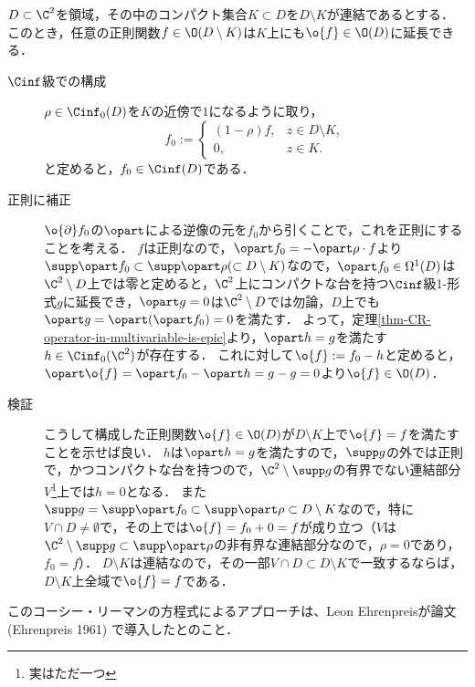 \documentclass[uplatex, dvipdfmx]{jsreport}
\begin{document}
\begin{theorem}[Hartogs (1906)]\label{thm-Hartogs}
    $D\subset\C^2$を領域，その中のコンパクト集合$K\subset D$を$D\setminus K$が連結であるとする．
    このとき，任意の正則関数$f\in\O(D\setminus K)$は$K$上にも$\o{f}\in\O(D)$に延長できる．
\end{theorem}
\begin{Proof}\mbox{}
    \begin{description}
        \item[$\Cinf$級での構成] 
        $\rho\in\Cinf_0(D)$を$K$の近傍で$1$になるように取り，\[f_0:=\begin{cases}(1-\rho)f,&z\in D\setminus K,\\0,&z\in K.\end{cases}\]と定めると，$f_0\in\Cinf(D)$である．
        \item[正則に補正]
        $\o{\partial}f_0$の$\opart$による逆像の元を$f_0$から引くことで，これを正則にすることを考える．
        $f$は正則なので，$\opart f_0=-\opart\rho\cdot f$より$\supp\opart f_0\subset\supp\opart\rho(\subset D\setminus K)$なので，$\opart f_0\in\Omega^1(D)$は$\C^2\setminus D$上では零と定めると，$\C^2$上にコンパクトな台を持つ$\Cinf$級1-形式$g$に延長でき，$\opart g=0$は$\C^2\setminus D$では勿論，$D$上でも$\opart g=\opart(\opart f_0)=0$を満たす．
        よって，定理\ref{thm-CR-operator-in-multivariable-is-epic}より，$\opart h=g$を満たす$h\in\Cinf_0(\C^2)$が存在する．
        これに対して$\o{f}:=f_0-h$と定めると，$\opart\o{f}=\opart f_0-\opart h=g-g=0$より$\o{f}\in\O(D)$．
        \item[検証] こうして構成した正則関数$\o{f}\in\O(D)$が$D\setminus K$上で$\o{f}=f$を満たすことを示せば良い．
        $h$は$\opart h=g$を満たすので，$\supp g$の外では正則で，かつコンパクトな台を持つので，$\C^2\setminus\supp g$の有界でない連結部分$V$\footnote{実はただ一つ}上では$h=0$となる．
        また$\supp g=\supp\opart f_0\subset\supp\opart\rho\subset D\setminus K$なので，特に$V\cap D\ne\emptyset$で，その上では$\o{f}=f_0+0=f$が成り立つ（$V$は$\C^2\setminus\supp g\subset\supp\opart\rho$の非有界な連結部分なので，$\rho=0$であり，$f_0=f$）．
        $D\setminus K$は連結なので，その一部$V\cap D\subset D\setminus K$で一致するならば，$D\setminus K$上全域で$\o{f}=f$である．
    \end{description}
\end{Proof}
\begin{remark}
    このコーシー・リーマンの方程式によるアプローチは、Leon Ehrenpreisが論文 (Ehrenpreis 1961) で導入したとのこと．
\end{remark}
\end{document}

